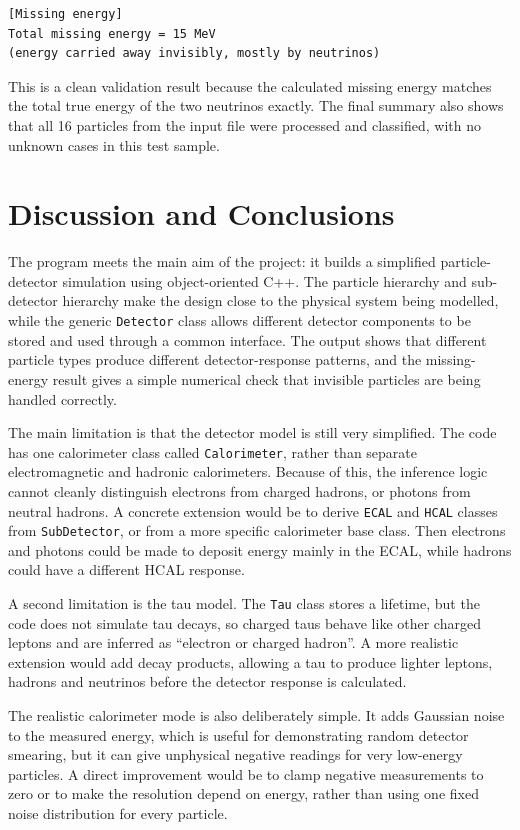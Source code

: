 \documentclass[11pt,a4paper]{article}
\begin{document}
\begin{lstlisting}[caption={Missing-energy output.}, label={lst:missingenergyoutput}]
[Missing energy]
Total missing energy = 15 MeV
(energy carried away invisibly, mostly by neutrinos)
\end{lstlisting}

This is a clean validation result because the calculated missing energy matches the total true energy of the two neutrinos exactly. The final summary also shows that all 16 particles from the input file were processed and classified, with no unknown cases in this test sample.

\section{Discussion and Conclusions}

The program meets the main aim of the project: it builds a simplified particle-detector simulation using object-oriented C++. The particle hierarchy and sub-detector hierarchy make the design close to the physical system being modelled, while the generic \texttt{Detector} class allows different detector components to be stored and used through a common interface. The output shows that different particle types produce different detector-response patterns, and the missing-energy result gives a simple numerical check that invisible particles are being handled correctly.

The main limitation is that the detector model is still very simplified. The code has one calorimeter class called \texttt{Calorimeter}, rather than separate electromagnetic and hadronic calorimeters. Because of this, the inference logic cannot cleanly distinguish electrons from charged hadrons, or photons from neutral hadrons. A concrete extension would be to derive \texttt{ECAL} and \texttt{HCAL} classes from \texttt{SubDetector}, or from a more specific calorimeter base class. Then electrons and photons could be made to deposit energy mainly in the ECAL, while hadrons could have a different HCAL response.

A second limitation is the tau model. The \texttt{Tau} class stores a lifetime, but the code does not simulate tau decays, so charged taus behave like other charged leptons and are inferred as ``electron or charged hadron''. A more realistic extension would add decay products, allowing a tau to produce lighter leptons, hadrons and neutrinos before the detector response is calculated.

The realistic calorimeter mode is also deliberately simple. It adds Gaussian noise to the measured energy, which is useful for demonstrating random detector smearing, but it can give unphysical negative readings for very low-energy particles. A direct improvement would be to clamp negative measurements to zero or to make the resolution depend on energy, rather than using one fixed noise distribution for every particle.
\end{document}
